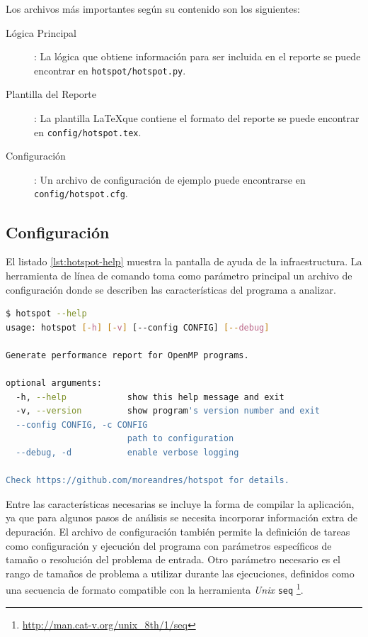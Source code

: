 \documentclass[a4paper]{report}
\begin{document}
\bigskip

Los archivos más importantes según su contenido son los siguientes:

\begin{description}
\item[Lógica Principal]: La lógica que obtiene información para ser incluida en el reporte se puede encontrar en {\tt hotspot/hotspot.py}.
\item[Plantilla del Reporte]: La plantilla \LaTeX que contiene el formato del reporte se puede encontrar en {\tt config/hotspot.tex}.
\item[Configuración]: Un archivo de configuración de ejemplo puede encontrarse en {\tt config/hotspot.cfg}.
\end{description}

\subsection{Configuración}

El listado \ref{lst:hotspot-help} muestra la pantalla de ayuda de la infraestructura.
La herramienta de línea de comando toma como parámetro principal un archivo de configuración donde se describen las características del programa a analizar. 

\begin{lstlisting}[language=bash, caption={Ayuda de {\tt hotspot}}, label={lst:hotspot-help}]
$ hotspot --help
usage: hotspot [-h] [-v] [--config CONFIG] [--debug]

Generate performance report for OpenMP programs.

optional arguments:
  -h, --help            show this help message and exit
  -v, --version         show program's version number and exit
  --config CONFIG, -c CONFIG
                        path to configuration
  --debug, -d           enable verbose logging

Check https://github.com/moreandres/hotspot for details.
\end{lstlisting}

\bigskip

Entre las características necesarias se incluye la forma de compilar la aplicación, ya que para algunos pasos de análisis se necesita incorporar información extra de depuración. El archivo de configuración también permite la definición de tareas como configuración y ejecución del programa con parámetros específicos de tamaño o resolución del problema de entrada. Otro parámetro necesario es el rango de tamaños de problema a utilizar durante las ejecuciones, definidos como una secuencia de formato compatible con la herramienta {\it Unix} {\tt seq} \footnote{\href{http://man.cat-v.org/unix\_8th/1/seq}{http://man.cat-v.org/unix\_8th/1/seq}}.
\end{document}
